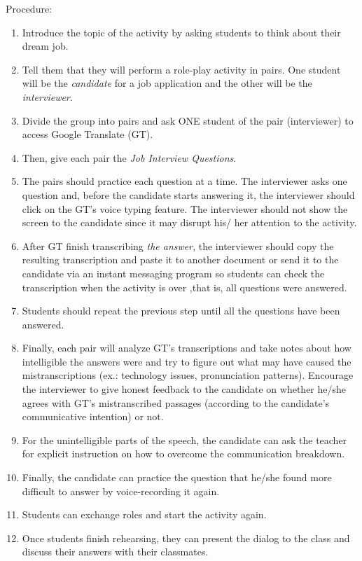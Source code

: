 \documentclass[english]{textolivre}
\begin{document}
\vspace{3ex}
Procedure:
\begin{enumerate}
\item Introduce the topic of the activity by asking students to think about their dream job.
\item Tell them that they will perform a role-play activity in pairs. One student will be the \emph{candidate} for a job application and the other will be the \emph{interviewer}.
\item Divide the group into pairs and ask ONE student of the pair (interviewer) to access Google Translate (GT).
\item Then, give each pair the \emph{Job Interview Questions}.
\item The pairs should practice each question at a time. The interviewer asks one question and, before the candidate starts answering it, the interviewer should click on the GT’s voice typing feature. The interviewer should not show the screen to the candidate since it may disrupt his/ her attention to the activity.
\item After GT finish transcribing \emph{the answer}, the interviewer should copy the resulting transcription and paste it to another document or send it to the candidate via an instant messaging program so students can check the transcription when the activity is over ,that is, all questions were answered. 
\item Students should repeat the previous step until all the questions have been answered.
\item Finally, each pair will analyze GT’s transcriptions and take notes about how intelligible the answers were and try to figure out what may have caused the mistranscriptions (ex.: technology issues, pronunciation patterns). Encourage the interviewer to give honest feedback to the candidate on whether he/she agrees with GT’s mistranscribed passages (according to the candidate’s communicative intention) or not.
\item For the unintelligible parts of the speech, the candidate can ask the teacher for explicit instruction on how to overcome the communication breakdown. 
\item Finally, the candidate can practice the question that he/she found more difficult to answer by voice-recording it again.
\item Students can exchange roles and start the activity again.
\item Once students finish rehearsing, they can present the dialog to the class and discuss their answers with their classmates. 
\end{enumerate}
\end{document}
